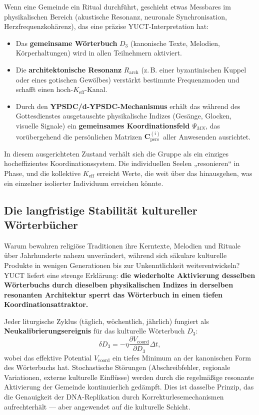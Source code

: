 \documentclass[12pt,a4paper]{article}
\newcommand{\Keff}{K_{\mathrm{eff}}}   %
\begin{document}
	Wenn eine Gemeinde ein Ritual durchführt, geschieht etwas Messbares im physikalischen Bereich (akustische Resonanz, neuronale Synchronisation, Herzfrequenzkohärenz), das eine präzise YUCT-Interpretation hat:
	\begin{itemize}
		\item Das \textbf{gemeinsame Wörterbuch} \(D_3\) (kanonische Texte, Melodien, Körperhaltungen) wird in allen Teilnehmern aktiviert.
		\item Die \textbf{architektonische Resonanz} \(R_{\mathrm{arch}}\) (z. B. einer byzantinischen Kuppel oder eines gotischen Gewölbes) verstärkt bestimmte Frequenzmoden und schafft einen hoch-\(\Keff\)-Kanal.
		\item Durch den \textbf{YPSDC/d‑YPSDC-Mechanismus} erhält das während des Gottesdienstes ausgetauschte physikalische Indizes (Gesänge, Glocken, visuelle Signale) ein \textbf{gemeinsames Koordinationsfeld \(\Psi_{MN}\)}, das vorübergehend die persönlichen Matrizen \(\mathbf{C}_{\text{pers}}^{(i)}\) aller Anwesenden ausrichtet.
	\end{itemize}
	
	In diesem ausgerichteten Zustand verhält sich die Gruppe als ein einziges hocheffizientes Koordinationssystem. Die individuellen Seelen „resonieren“ in Phase, und die kollektive \(K_{\mathrm{eff}}\) erreicht Werte, die weit über das hinausgehen, was ein einzelner isolierter Individuum erreichen könnte.
	
	\subsection{Die langfristige Stabilität kultureller Wörterbücher}
	
	Warum bewahren religiöse Traditionen ihre Kerntexte, Melodien und Rituale über Jahrhunderte nahezu unverändert, während sich säkulare kulturelle Produkte in wenigen Generationen bis zur Unkenntlichkeit weiterentwickeln? YUCT liefert eine strenge Erklärung: \textbf{die wiederholte Aktivierung desselben Wörterbuchs durch dieselben physikalischen Indizes in derselben resonanten Architektur sperrt das Wörterbuch in einen tiefen Koordinationsattraktor.}
	
	Jeder liturgische Zyklus (täglich, wöchentlich, jährlich) fungiert als \textbf{Neukalibrierungsereignis} für das kulturelle Wörterbuch \(D_3\):
	\begin{equation}
		\delta D_3 = -\eta \frac{\partial V_{\text{coord}}}{\partial D_3} \Delta t,
	\end{equation}
	wobei das effektive Potential \(V_{\text{coord}}\) ein tiefes Minimum an der kanonischen Form des Wörterbuchs hat. Stochastische Störungen (Abschreibfehler, regionale Variationen, externe kulturelle Einflüsse) werden durch die regelmäßige resonante Aktivierung der Gemeinde kontinuierlich gedämpft. Dies ist dasselbe Prinzip, das die Genauigkeit der DNA-Replikation durch Korrekturlesemechanismen aufrechterhält — aber angewendet auf die kulturelle Schicht.
	
\end{document}
